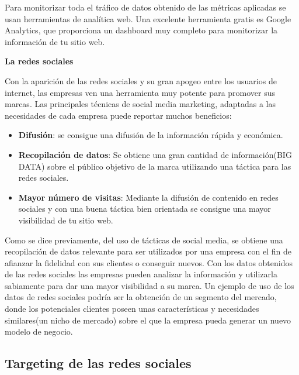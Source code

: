 Para monitorizar toda el tráfico de datos obtenido de las métricas aplicadas se usan herramientas de analítica web. Una excelente herramienta gratis es Google Analytics, que proporciona un dashboard muy completo para monitorizar la información de tu sitio web.

\textbf{La redes sociales} 

\vspace{5 mm}

Con la aparición de las redes sociales y su gran apogeo entre los usuarios de internet, las empresas ven una herramienta muy potente para promover sus marcas. Las principales técnicas de social media marketing, adaptadas a las necesidades de cada empresa  puede reportar muchos beneficios:

\begin{itemize}

\item \textbf{Difusión}: se consigue una difusión de la información rápida y económica.

\item \textbf{Recopilación de datos}: Se obtiene una gran cantidad de información(BIG DATA) sobre el público objetivo de la marca utilizando una táctica para las redes sociales.

\item \textbf{Mayor número de visitas}: Mediante la difusión de contenido en redes sociales y con una buena táctica bien orientada se consigue una mayor visibilidad de tu sitio web.

\end{itemize}

Como se dice previamente, del uso de tácticas de social media, se obtiene una recopilación de datos relevante para ser utilizados por una empresa con el fin de afianzar la fidelidad con sus clientes o conseguir nuevos. Con los datos obtenidos de las redes sociales las empresas pueden analizar la información y utilizarla sabiamente para dar una mayor visibilidad a su marca. Un ejemplo de uso de los datos de redes sociales podría ser la obtención de un segmento del mercado, donde los potenciales clientes poseen unas características y necesidades similares(un nicho de mercado) sobre el que la empresa pueda generar un nuevo modelo de negocio.


\subsection{Targeting de las redes sociales}

